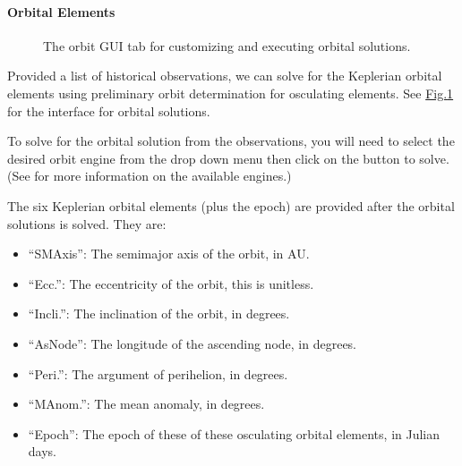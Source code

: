\documentclass[letterpaper,11pt,english]{sphinxmanual}
\begin{document}
\paragraph{Orbital Elements}
\label{\detokenize{user/manual_mode:orbital-elements}}\label{\detokenize{user/manual_mode:user-manual-mode-procedure-orbital-elements}}
\begin{figure}[htbp]
\centering
\capstart

\noindent{}
\caption{The orbit GUI tab for customizing and executing orbital solutions.}\label{\detokenize{user/manual_mode:id8}}\label{\detokenize{user/manual_mode:figure-manual-mode-gui-orbit}}\end{figure}

\sphinxAtStartPar
Provided a list of historical observations, we can solve for the Keplerian
orbital elements using preliminary orbit determination for osculating elements.
See \hyperref[\detokenize{user/manual_mode:figure-manual-mode-gui-orbit}]{Fig.\@ \ref{\detokenize{user/manual_mode:figure-manual-mode-gui-orbit}}} for the interface for orbital
solutions.

\sphinxAtStartPar
To solve for the orbital solution from the observations, you will need to
select the desired orbit engine from the drop down menu then click on the
 button to solve.
(See {\hyperref[\detokenize{technical/architecture/services_engines:technical-architecture-services-engines}]{}} for more information on
the available engines.)

\sphinxAtStartPar
The six Keplerian orbital elements (plus the epoch) are provided after the
orbital solutions is solved. They are:
\begin{itemize}
\item {} 
\sphinxAtStartPar
“SM\sphinxhyphen{}Axis”: The semi\sphinxhyphen{}major axis of the orbit, in AU.

\item {} 
\sphinxAtStartPar
“Ecc.”: The eccentricity of the orbit, this is unit\sphinxhyphen{}less.

\item {} 
\sphinxAtStartPar
“Incli.”: The inclination of the orbit, in degrees.

\item {} 
\sphinxAtStartPar
“As\sphinxhyphen{}Node”: The longitude of the ascending node, in degrees.

\item {} 
\sphinxAtStartPar
“Peri.”: The argument of perihelion, in degrees.

\item {} 
\sphinxAtStartPar
“M\sphinxhyphen{}Anom.”: The mean anomaly, in degrees.

\item {} 
\sphinxAtStartPar
“Epoch”: The epoch of these of these osculating orbital elements, in Julian days.

\end{itemize}
\end{document}
